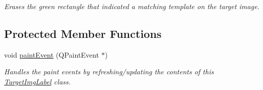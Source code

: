 \begin{DoxyCompactItemize}
\begin{DoxyCompactList}\small\item\em Erases the green rectangle that indicated a matching template on the target image. \item\end{DoxyCompactList}\end{DoxyCompactItemize}
\subsection*{Protected Member Functions}
\begin{DoxyCompactItemize}
\item 
\hypertarget{classTargetImgLabel_a30f9fc1657bdf5a9459bd78d5a94c65b}{
void \hyperlink{classTargetImgLabel_a30f9fc1657bdf5a9459bd78d5a94c65b}{paintEvent} (QPaintEvent $\ast$)}
\label{classTargetImgLabel_a30f9fc1657bdf5a9459bd78d5a94c65b}

\begin{DoxyCompactList}\small\item\em Handles the paint events by refreshing/updating the contents of this \hyperlink{classTargetImgLabel}{TargetImgLabel} class. \item\end{DoxyCompactList}\end{DoxyCompactItemize}
